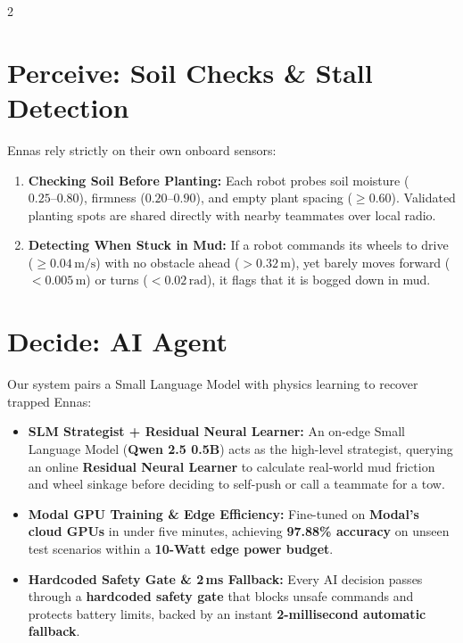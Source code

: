 \documentclass[9pt,a4paper]{article}
\begin{document}
\begin{multicols}{2}
\section{\textbf{Perceive: Soil Checks \& Stall Detection}}
Ennas rely strictly on their own onboard sensors:
\begin{enumerate}
    \item \textbf{Checking Soil Before Planting:} Each robot probes soil moisture ($0.25\text{--}0.80$), firmness ($0.20\text{--}0.90$), and empty plant spacing ($\geq 0.60$). Validated planting spots are shared directly with nearby teammates over local radio.
    \item \textbf{Detecting When Stuck in Mud:} If a robot commands its wheels to drive ($\geq 0.04\,\text{m/s}$) with no obstacle ahead ($>0.32\,\text{m}$), yet barely moves forward ($<0.005\,\text{m}$) or turns ($<0.02\,\text{rad}$), it flags that it is bogged down in mud.
\end{enumerate}

\section{\textbf{Decide: AI Agent}}
Our system pairs a Small Language Model with physics learning to recover trapped Ennas:
\begin{itemize}
    \item \textbf{SLM Strategist + Residual Neural Learner:} An on-edge Small Language Model (\textbf{Qwen 2.5 0.5B}) acts as the high-level strategist, querying an online \textbf{Residual Neural Learner} to calculate real-world mud friction and wheel sinkage before deciding to self-push or call a teammate for a tow.
    \item \textbf{Modal GPU Training \& Edge Efficiency:} Fine-tuned on \textbf{Modal's cloud GPUs} in under five minutes, achieving \textbf{97.88\% accuracy} on unseen test scenarios within a \textbf{10-Watt edge power budget}.
    \item \textbf{Hardcoded Safety Gate \& 2\,ms Fallback:} Every AI decision passes through a \textbf{hardcoded safety gate} that blocks unsafe commands and protects battery limits, backed by an instant \textbf{2-millisecond automatic fallback}.
\end{itemize}


\end{multicols}
\end{document}
